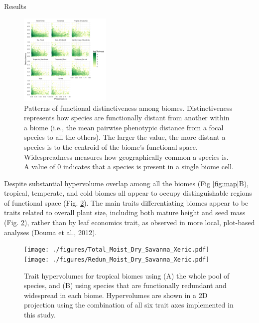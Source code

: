 \documentclass[final]{beamer}
\newlength{\twocolwid}
\begin{document}
\begin{frame}[t]
\begin{columns}[t]
\begin{column}{\twocolwid}
\begin{block}{Results}
\begin{multicols}{2}
\begin{figure}[h]
	\centering
	\includegraphics[width=0.39\textwidth]{./figures/All_biomes_heatmap_logTraits.pdf}
	\caption{Patterns of functional distinctiveness among biomes. Distinctiveness represents how species are functionally distant from another within a biome (i.e., the mean pairwise phenotypic distance from a focal species to all the others). The larger the value, the more distant a species is to the centroid of the biome's functional space. Widespreadness measures how geographically common a species is. A value of 0 indicates that a species is present in a single biome cell. }
	\label{fig:distinct_common}
\end{figure}


   Despite substantial hypervolume overlap among all the biomes (Fig \ref{fig:map}B), tropical, temperate, and cold biomes all appear to occupy distinguishable regions of functional space (Fig. \ref{fig:hypervolumes}). The main traits differentiating biomes appear to be traits related to overall plant size, including both mature height and seed mass (Fig. \ref{fig:hypervolumes}), rather than by leaf economics trait, as observed in more local, plot-based analyses (Douma et al., 2012).   		

\begin{figure}[h]
	\centering
	\texttt{[image: ./figures/Total\_Moist\_Dry\_Savanna\_Xeric.pdf]}
	~
	\texttt{[image: ./figures/Redun\_Moist\_Dry\_Savanna\_Xeric.pdf]}
	\caption{Trait hypervolumes for tropical biomes using (A) the whole pool of species, and (B) using species that are functionally
redundant and widespread in each biome. Hypervolumes are shown in a 2D projection using the combination of all six trait axes implemented
in this study.}
	\label{fig:hypervolumes}
\end{figure}


\end{multicols}
\end{block}
\end{column}
\end{columns}
\end{frame}
\end{document}
